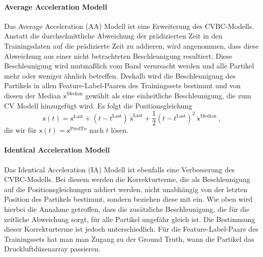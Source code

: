 \paragraph{Average Acceleration Modell}




Das Average Acceleration (AA) Modell ist eine Erweiterung des CVBC-Modells.
Anstatt die durchschnittliche Abweichung der prädizierten Zeit in den Trainingsdaten auf die prädizierte Zeit zu addieren, wird angenommen, 
dass diese Abweichung aus einer nicht betrachteten Beschleunigung resultiert.
Diese Beschleunigung wird mutmaßlich vom Band verursacht werden und alle Partikel mehr oder weniger ähnlich betreffen.
Deshalb wird die Beschleunigung des Partikels in allen Feature-Label-Paaren des Trainingssets bestimmt
und von diesen der Median \(\ddot{ \mathsf{x}}^{\text{Median}}\) gewählt als eine einheitliche Beschleunigung, die zum CV Modell hinzugefügt wird.
Es folgt die Positionsgleichung
\begin{equation*}
    \mathsf{x}(t) =  \mathsf{x}^{\text{Last}} + (t - t^{\text{Last}}) \: \dot{ \mathsf{x}}^{\text{Last}} 
    + \frac{1}{2} (t - t^{\text{Last}})^2 \: \ddot{ \mathsf{x}}^{\text{Median}} \: ,
\end{equation*}
% 
die wir für \(\mathsf{x}(t) =  \mathsf{x}^{\text{PredTo}}\) nach \(t\) lösen.


\paragraph{Identical Acceleration Modell}


Das Identical Acceleration (IA) Modell ist ebenfalls eine Verbesserung des CVBC-Modells. 
Bei diesem werden die Korrekturterme, die als Beschleunigung auf die Positionsgleichungen addiert werden, nicht unabhängig von der letzten Position des Partikels bestimmt, sondern beziehen diese mit ein.
Wie oben wird hierbei die Annahme getroffen, dass die zusätzliche Beschleunigung, die für die zeitliche Abweichung sorgt, für alle Partikel ungefähr gleich ist.
Die Bestimmung dieser Korrekturterme ist jedoch unterschiedlich.
Für die Feature-Label-Paare des Trainingssets hat man man Zugang zu der Ground Truth, wann die Partikel das Druckluftdüsenarray passieren.

